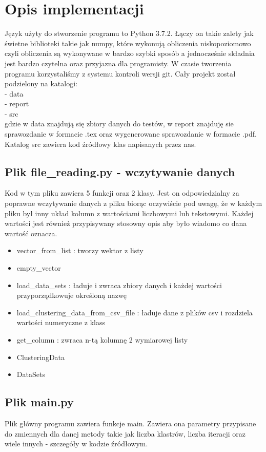 \documentclass{classrep}
\begin{document}
\section{Opis implementacji}
{Język użyty do stworzenie programu to Python 3.7.2. Łączy on takie zalety jak świetne biblioteki takie jak numpy, które wykonują obliczenia niskopoziomowo czyli obliczenia są wykonywane w bardzo szybki sposób a jednocześnie składnia jest bardzo czytelna oraz przyjazna dla programisty. W czasie tworzenia programu korzystaliśmy z systemu kontroli wersji git. Cały projekt został podzielony na katalogi:\\
- data\\
- report\\
- src\\
gdzie w data znajdują się zbiory danych do testów, w report znajduję sie sprawozdanie w formacie .tex oraz wygenerowane sprawozdanie w formacie .pdf. Katalog src zawiera kod źródłowy klas napisanych przez nas.
	\subsection{Plik file\_reading.py - wczytywanie danych}
	{
		Kod w tym pliku zawiera 5 funkcji oraz 2 klasy. Jest on odpowiedzialny za poprawne wczytywanie danych z pliku biorąc oczywiście pod uwagę, że w każdym pliku był inny układ kolumn z wartościami liczbowymi lub tekstowymi. Każdej wartości jest również przypisywany stosowny opis aby było wiadomo co dana wartość oznacza.
		\begin{itemize}
			\item vector\_from\_list : tworzy wektor z listy
			\item empty\_vector 
			\item load\_data\_sets : ładuje i zwraca zbiory danych i każdej wartości przyporządkowuje określoną nazwę
			\item load\_clustering\_data\_from\_csv\_file : ładuje dane z plików csv i rozdziela wartości numeryczne z klass
			\item get\_column : zwraca n-tą kolumnę 2 wymiarowej listy
			\item ClusteringData
			\item DataSets
		\end{itemize}
	}
	\subsection{Plik  main.py}
	{
		Plik główny programu zawiera funkcje main. Zawiera ona parametry przypisane do zmiennych dla danej metody takie jak liczba klastrów, liczba iteracji oraz wiele innych - szczegóły w kodzie źródłowym.
	}
}
\end{document}
